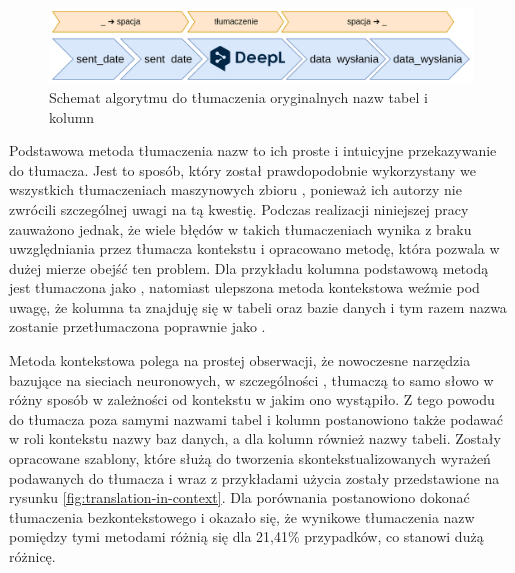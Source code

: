 \begin{figure}[ht!]
  \centering
  \includegraphics[width=1.0\linewidth]{images/multi_word_translation.png}
  \caption{Schemat algorytmu do tłumaczenia oryginalnych nazw tabel i kolumn}
  \label{fig:multi-word-translation}
\end{figure}

Podstawowa metoda tłumaczenia nazw to ich proste i intuicyjne przekazywanie do tłumacza. Jest to sposób, który został prawdopodobnie wykorzystany we wszystkich tłumaczeniach maszynowych zbioru , ponieważ ich autorzy nie zwrócili szczególnej uwagi na tą kwestię. Podczas realizacji niniejszej pracy zauważono jednak, że wiele błędów w takich tłumaczeniach wynika z braku uwzględniania przez tłumacza kontekstu i opracowano metodę, która pozwala w dużej mierze obejść ten problem. Dla przykładu kolumna  podstawową metodą jest tłumaczona jako , natomiast ulepszona metoda kontekstowa weźmie pod uwagę, że kolumna ta znajduję się w tabeli  oraz bazie danych  i tym razem nazwa zostanie przetłumaczona poprawnie jako .

Metoda kontekstowa polega na prostej obserwacji, że nowoczesne narzędzia bazujące na sieciach neuronowych, w szczególności , tłumaczą to samo słowo w różny sposób w zależności od kontekstu w jakim ono wystąpiło. Z tego powodu do tłumacza poza samymi nazwami tabel i kolumn postanowiono także podawać w roli kontekstu nazwy baz danych, a dla kolumn również nazwy tabeli. Zostały opracowane szablony, które służą do tworzenia skontekstualizowanych wyrażeń podawanych do tłumacza i wraz z przykładami użycia zostały przedstawione na rysunku \ref{fig:translation-in-context}. Dla porównania postanowiono dokonać tłumaczenia bezkontekstowego i okazało się, że wynikowe tłumaczenia nazw pomiędzy tymi metodami różnią się dla 21,41\% przypadków, co stanowi dużą różnicę.

